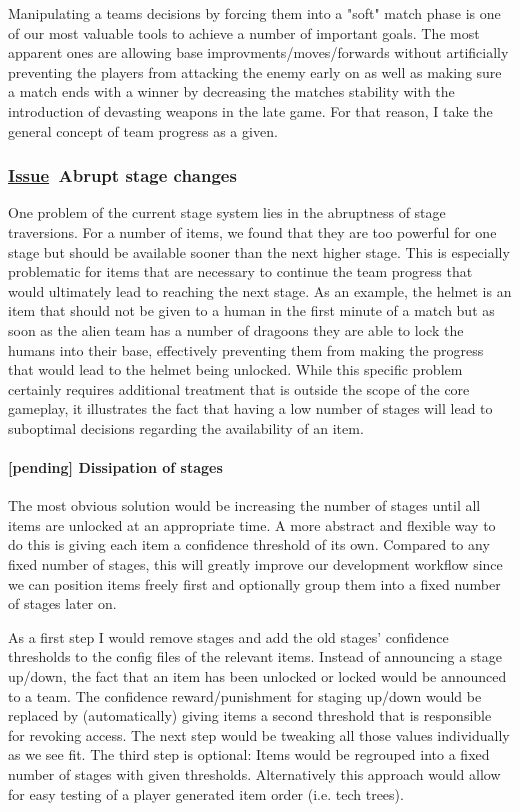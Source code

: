 \documentclass{scrartcl}
\newcommand{\issue}    [0]{\textbf{\underline{Issue}\ }}
\newcommand{\pending}  [0]{\textcolor{pending}  {\textbf{[pending] }}}
\begin{document}
Manipulating a teams decisions by forcing them into a "soft" match phase is one of our most valuable tools to achieve a number of important goals. The most apparent ones are allowing base improvments/moves/forwards without artificially preventing the players from attacking the enemy early on as well as making sure a match ends with a winner by decreasing the matches stability with the introduction of devasting weapons in the late game. For that reason, I take the general concept of team progress as a given.

\subsubsection{\issue Abrupt stage changes}

One problem of the current stage system lies in the abruptness of stage traversions. For a number of items, we found that they are too powerful for one stage but should be available sooner than the next higher stage. This is especially problematic for items that are necessary to continue the team progress that would ultimately lead to reaching the next stage. As an example, the helmet is an item that should not be given to a human in the first minute of a match but as soon as the alien team has a number of dragoons they are able to lock the humans into their base, effectively preventing them from making the progress that would lead to the helmet being unlocked. While this specific problem certainly requires additional treatment that is outside the scope of the core gameplay, it illustrates the fact that having a low number of stages will lead to suboptimal decisions regarding the availability of an item.

\paragraph{\pending Dissipation of stages}

The most obvious solution would be increasing the number of stages until all items are unlocked at an appropriate time. A more abstract and flexible way to do this is giving each item a confidence threshold of its own. Compared to  any fixed number of stages, this will greatly improve our development workflow since we can position items freely first and optionally group them into a fixed number of stages later on.

As a first step I would remove stages and add the old stages' confidence thresholds to the config files of the relevant items. Instead of announcing a stage up/down, the fact that an item has been unlocked or locked would be announced to a team. The confidence reward/punishment for staging up/down would be replaced by (automatically) giving items a second threshold that is responsible for revoking access. The next step would be tweaking all those values individually as we see fit. The third step is optional: Items would be regrouped into a fixed number of stages with given thresholds. Alternatively this approach would allow for easy testing of a player generated item order (i.e. tech trees).
\end{document}
